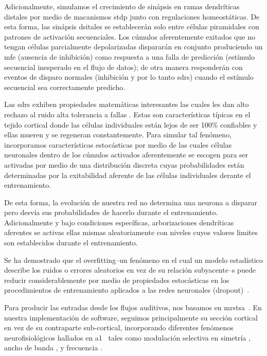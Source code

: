 {Adicionalmente, simulamos el crecimiento de sinápsis en ramas dendríticas distales por medio de macanismos \gls{stdp} junto con
regulaciones homeostáticas. De esta forma, las sinápsis dsitales se establecerán solo entre células piramidales con patrones de activación secuenciales.
Los cúmulos aferentemente exitados que no tengan células parcialmente depolarizadas dispararán en conjunto produciendo un \gls{mfe}
(ausencia de inhibición) como respuesta a una falla de predicción (estímulo secuencial inesperado en el flujo de datos); de otra manera responderán con eventos de disparo normales (inhibición y por lo tanto \glspl{sdr}) cuando el estímulo secuencial sea correctamente predicho.

Las \glspl{sdr} exhiben propiedades matemáticas interesantes las cuales les dan alto rechazo al ruido alta tolerancia a fallas \cite{ahmad_2015}.
Estas son características típicas en el tejido cortical donde las células individuales están lejos de ser 100\% confiables y ellas mueren y se regeneran constantemente. Para simular tal fenómeno, incorporamos características estocásticas por medio de las cuales células neuronales dentro de los cúmulos activados aferentemente se escogen para ser activadas por medio de una distribución discreta cuyas probabilidades están determinadas por la exitabilidad aferente de las células individuales derante el entrenamiento.

De esta forma, la evolución de nuestra red no determina una neurona a disparar pero desvía sus probabilidades de hacerlo durante el entrenamiento. Adicionalmente y bajo condiciones específicas, arborizaciones dendríticas aferentes se activas ellas mismas aleatoriamente con niveles cuyos valores limites son establecidos durante el entrenamiento.

Se ha demostrado que el overfitting--un fenómeno en el cual un modelo estadístico describe los ruidos o errores aleatorios en vez de su relación subyacente--s puede reducir considerablemente por medio de propiedades estocásticas en los procedimientos de entrenamiento aplicados a las redes neuronales (dropout)~\cite{JMLR:v15:srivastava14a}.

Para producir las entradas desde los flujos auditivos, nos basamos en \gls{mrstsa}~\cite{chi_2005}. En nuestra implementación de software, seguimos principalmente su sección cortical en vez de su contraparte sub-cortical, incorporando diferentes fenómenos neurofisiológicos hallados en \gls{a1}~\cite{wang_1995} tales como modulación selectiva en simetría \cite{shamma_1993}, ancho de banda \cite{schreiner_1990}, y frecuencia \cite{shamma_1993,heil_1992,mendelson_1985}.



}
